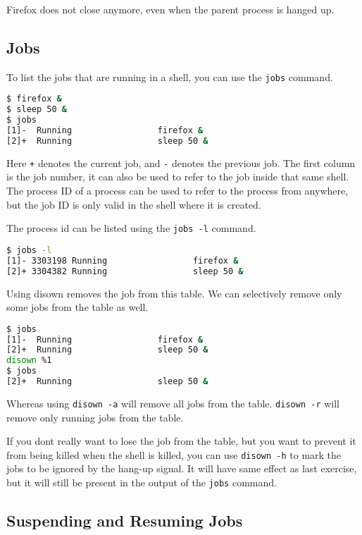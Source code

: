 Firefox does not close anymore, even when the parent process is hanged up.

\subsection{Jobs}

To list the jobs that are running in a shell, you can use the \texttt{jobs} command.

\begin{lstlisting}[language=bash]
$ firefox &
$ sleep 50 &
$ jobs
[1]-  Running                 firefox &
[2]+  Running                 sleep 50 &
\end{lstlisting}

Here \texttt{+} denotes the current job, and \texttt{-} denotes the previous job.
The first column is the job number, it can also be used to refer to the job
inside that same shell. The process ID of a process can be used to refer to
the process from anywhere, but the job ID is only valid in the shell where
it is created.

The process id can be listed using the \texttt{jobs -l} command.

\begin{lstlisting}[language=bash]
$ jobs -l
[1]- 3303198 Running                 firefox &
[2]+ 3304382 Running                 sleep 50 &
\end{lstlisting}

Using disown removes the job from this table. We can selectively
remove only some jobs from the table as well.

\begin{lstlisting}[language=bash]
$ jobs
[1]-  Running                 firefox &
[2]+  Running                 sleep 50 &
disown %1
$ jobs
[2]+  Running                 sleep 50 &
\end{lstlisting}

Whereas using \texttt{disown -a} will remove all jobs from the table.
\texttt{disown -r} will remove only running jobs from the table.

If you dont really want to lose the job from the table, but you want to
prevent it from being killed when the shell is killed, you can use
\texttt{disown -h} to mark the jobs to be ignored by the hang-up signal.
It will have same effect as last exercise, but it will still be present
in the output of the \texttt{jobs} command.

\subsection{Suspending and Resuming Jobs}

